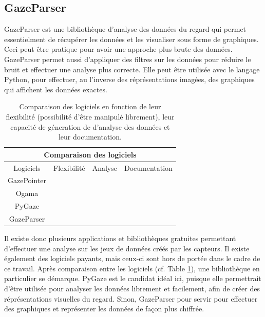 \documentclass[12pt]{article}
\newcommand{\cmark}{\ding{51}}
\newcommand{\xmark}{\ding{55}}
\begin{document}
\subsection{GazeParser}

GazeParser \cite{gazeparser} est une bibliothèque d'analyse des données du
regard qui permet essentielment de récupérer les données et les visualiser sous
forme de graphiques. Ceci peut être pratique pour avoir une approche plus brute
des données. GazeParser permet aussi d'appliquer des filtres sur les données
pour réduire le bruit et effectuer une analyse plus correcte. Elle peut être
utilisée avec le langage Python, pour effectuer, au l'inverse des
réprésentations imagées, des graphiques qui affichent les données exactes.


\bigskip
\begin{table}[htpb]
  \begin{center}
    \begin{tabular}{|c||c|c|c|}
      \hline
      \multicolumn{4}{|c|}{Comparaison des logiciels}             \\
      \hline
      Logiciels   & Flexibilité   & Analyse       & Documentation \\
      \hline
      GazePointer & \xmark        & \cmark        & \cmark        \\
      Ogama       & \xmark        & \cmark \cmark & \cmark        \\
      PyGaze      & \cmark \cmark & \cmark \cmark & \cmark \cmark \\
      GazeParser  & \cmark        & \cmark \cmark & \cmark        \\
      \hline
    \end{tabular}
    \caption{Comparaison des logiciels en fonction de leur flexibilité
      (possibilité d'être manipulé librement), leur capacité de géneration de
      d'analyse des données et leur documentation.}
    \label{tab:comparaison}
  \end{center}
\end{table}

Il existe donc plusieurs applications et bibliothèques gratuites permettant
d'effectuer une analyse sur les jeux de données créés par les capteurs. Il
existe également des logiciels payants, mais ceux-ci sont hors de portée dans le
cadre de ce travail. Après comparaison entre les logiciels (cf. Table
\ref{tab:comparaison}), une bibliothèque en particulier se démarque. PyGaze est
le candidat idéal ici, puisque elle permettrait d'être utilisée pour analyser
les données librement et facilement, afin de créer des réprésentations visuelles
du regard. Sinon, GazeParser pour servir pour effectuer des graphiques et
représenter les données de façon plus chiffrée.
\end{document}
